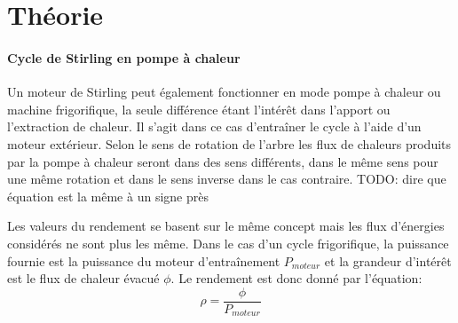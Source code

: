 \section{Théorie}






\paragraph*{Cycle de Stirling en pompe à chaleur}
Un moteur de Stirling peut également fonctionner en mode pompe à chaleur ou machine frigorifique, la seule différence étant l'intérêt dans l'apport ou l'extraction de chaleur. Il s'agit dans ce cas d'entraîner le cycle à l'aide d'un moteur extérieur. Selon le sens de rotation de l'arbre les flux de chaleurs produits par la pompe à chaleur seront dans des sens différents, dans le même sens pour une même rotation et dans le sens inverse dans le cas contraire. TODO: dire que équation est la même à un signe près

Les valeurs du rendement se basent sur le même concept mais les flux d'énergies considérés ne sont plus les même. Dans le cas d'un cycle frigorifique, la puissance fournie est la puissance du moteur d'entraînement \(P_{moteur}\) et la grandeur d'intérêt est le flux de chaleur évacué \(\phi\). Le rendement est donc donné par l'équation:
\begin{equation}
    \rho = \frac{\phi}{P_{moteur}}
    \label{eq:rend-frigo}
\end{equation}